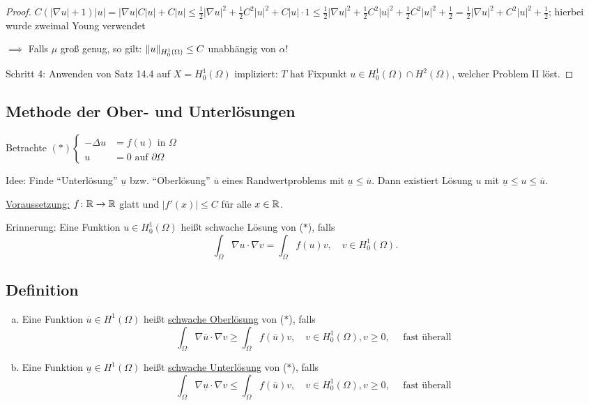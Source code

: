 \begin{proof}
  {\tiny{$ C(|\nabla u| + 1)|u| = |\nabla u| C |u| + C|u| \leq \frac{1}{2} |\nabla u|^2 + \frac{1}{2} C^2|u|^2 + C|u| \cdot 1 \leq \frac{1}{2}|\nabla u|^2 + \frac{1}{2} C^2 |u|^2 + \frac{1}{2} C^2 |u|^2 + \frac{1}{2} = \frac{1}{2}|\nabla u|^2 + C^2 |u|^2 + \frac{1}{2}$; hierbei wurde zweimal Young verwendet}}

  $\implies$ Falls $\mu$ groß genug, so gilt: $\lVert u \rVert_{H_0^1(\Omega)} \leq C$ unabhängig von $\alpha$!

  Schritt 4: Anwenden von Satz 14.4 auf $X = H_0^1(\Omega)$ impliziert: $T$ hat Fixpunkt $u \in H_0^1(\Omega) \cap H^2(\Omega)$, welcher Problem II löst.
\end{proof}

\subsection{Methode der Ober- und Unterlösungen}

Betrachte $(\ast) \begin{cases} -\Delta u &= f(u) \text{ in } \Omega \\ u &= 0 \text{ auf } \partial \Omega \end{cases}$

Idee: Finde ``Unterlösung'' $\underline{u}$ bzw. ``Oberlösung'' $\overline{u}$ eines Randwertproblems mit $\underline u \leq \overline u$. 
Dann existiert Lösung $u$ mit $\underline u \leq u \leq \overline u$.

\underline{Voraussetzung:} $f \colon \mathbb{R} \to \mathbb{R}$ glatt und $|f'(x)| \leq C$ für alle $x \in \mathbb{R}$.

Erinnerung: Eine Funktion $u \in H_0^1(\Omega)$ heißt schwache Lösung von ($\ast$), falls
$$ \int_\Omega \nabla u \cdot \nabla v = \int_\Omega f(u) v, \quad v \in H_0^1(\Omega).$$

\subsection{Definition}

\begin{enumerate}[a)]
  \item Eine Funktion $\overline{u} \in H^1(\Omega)$ heißt \underline{schwache Oberlösung} von ($\ast$), falls
    $$
    \int_\Omega \nabla \overline u \cdot \nabla v \geq \int_\Omega f(\overline u) v, \quad v \in H_0^1(\Omega), v \geq 0, \quad \text{ fast überall}
    $$

  \item Eine Funktion $\underline u \in H^1(\Omega)$ heißt \underline{schwache Unterlösung} von ($\ast$), falls
    $$
    \int_\Omega \nabla \underline u \cdot \nabla v \leq \int_\Omega f(\overline u) v, \quad v \in H_0^1(\Omega), v \geq 0, \quad \text{ fast überall}
    $$
\end{enumerate}

